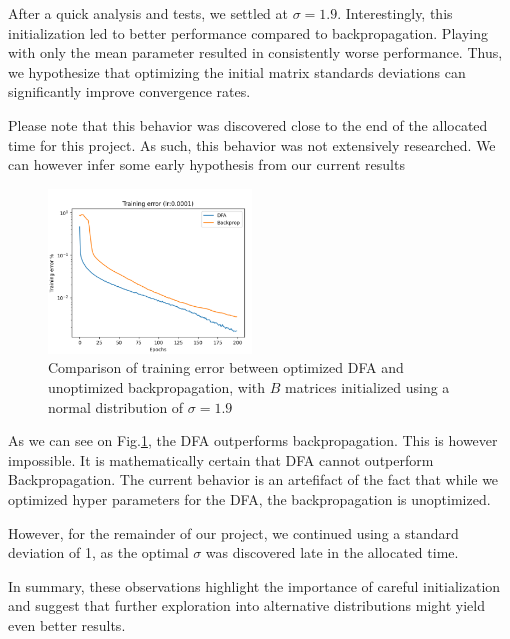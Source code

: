\documentclass[english]{article}
\begin{document}
After a quick analysis and tests, we settled at \(\sigma=1.9\). Interestingly, this initialization led to better performance compared to backpropagation. Playing with only the mean parameter resulted in consistently worse performance. Thus, we hypothesize that optimizing the initial matrix standards deviations can significantly improve convergence rates.

Please note that this behavior was discovered close to the end of the allocated time for this project. As such, this behavior was not extensively researched.  We can however infer some early hypothesis from our current results

\begin{figure}[h!]
    \centering
    \includegraphics[width=0.48\textwidth]{rsc/DFA_BACK/DFA_Back_opti_mat_to_std=1.8.png}
    \caption{Comparison of training error between optimized DFA and unoptimized backpropagation, with \(B\) matrices initialized using a normal distribution of \(\sigma=1.9\)}\label{fig:DFA_BACK_group}
\end{figure}

As we can see on Fig.\ref{fig:DFA_BACK_group}, the DFA outperforms backpropagation. This is however impossible. It is mathematically certain that DFA cannot outperform Backpropagation\cite{2016arXiv160901596N}. The current behavior is an artefifact of the fact that while we optimized hyper parameters for the DFA, the backpropagation is unoptimized. 

However, for the remainder of our project, we continued using a standard deviation of 1, as the optimal \(\sigma\) was discovered late in the allocated time.

In summary, these observations highlight the importance of careful initialization and suggest that further exploration into alternative distributions might yield even better results.
\end{document}
